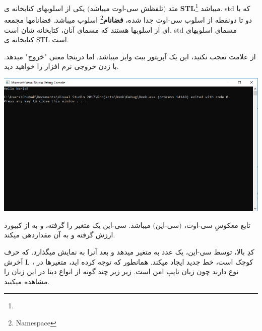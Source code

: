 \documentclass[14pt,a4paper]{memoir}
\begin{document}
	 متد  $ \text{(تلفظش سی-اوت میباشد)} $ یکی از اسلوبهای کتابخانه ی \textbf{STL}\footnote{} میباشد. std که با دو تا دونقطه از اسلوب سی-اوت جدا شده، \textbf{فضانام}\footnote{Namespace} اسلوب میباشد.  فضانامها مجمعه ای از اسلوبها هستند که مسمای آنان، کتابخانه شان است. std مسمای اسلوبهای کتابخانه ی STL است.
	 
	 از علامت \lr{\mono\lstinline|>>|} تعجب نکنید، این یک آپریتور بیت وایز میباشد. اما درینجا معنی "خروج" میدهد. با زدن  خروجی نرم افزار را خواهید دید.
	 
	 \begin{center}
	 	\includegraphics[scale=0.3]{HelloWorld}
	 \end{center}
	 
	 
	 تابع معکوسِ سی-اوت،  $ \text{(سی-این)} $ میباشد. سی-این یک متغیر را گرفته، و به از کیبورد ارزش گرفته و به آن مقداردهی میکند.
	 
	 	 	 	 	 \begin{latin}
 	
	 	
	 \end{latin}
	 
	 
	 کدِ بالا، توسط سی-این، یک عدد به متغیر میدهد و بعد آنرا به نمایش میگذارد.  که حرف آخرش L کوچک است، خط جدید ایجاد میکند.
	 همانطور که توجه کرده اید، متغیرها در ، نوع دارند چون  زبان تایپ امن است. زیر زیر چند گونه از انواع دیتا در این زبان را مشاهده میکنید.
	 	 	 	 \begin{latin}
	
\end{latin}
	 
\end{document}
